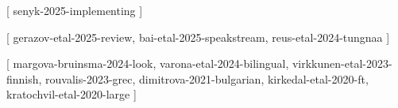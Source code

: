 \documentclass[a4paper, 12pt]{article}
\title{%
  \trans{%
    Списък на цитиранията%
  }{%
    List of Citations%
  }
}
\date{}
\author{}
\begin{document}
  \maketitle

  \begin{pubenumerate}


    [
      senyk-2025-implementing
    ]

    [
      gerazov-etal-2025-review,
      bai-etal-2025-speakstream,
      reus-etal-2024-tungnaa
    ]



    [
      margova-bruinsma-2024-look,
      varona-etal-2024-bilingual,
      virkkunen-etal-2023-finnish,
      rouvalis-2023-grec,
      dimitrova-2021-bulgarian,
      kirkedal-etal-2020-ft,
      kratochvil-etal-2020-large
    ]

  \end{pubenumerate}
\end{document}
